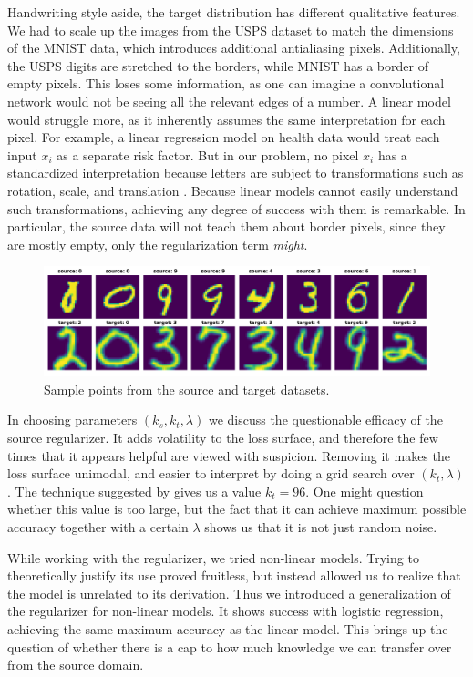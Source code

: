 \documentclass[twoside,11pt]{article}
\begin{document}
Handwriting style aside, the target distribution has different qualitative features. We had to scale up the images from the USPS dataset to match the dimensions of the MNIST data, which introduces additional antialiasing pixels. Additionally, the USPS digits are stretched to the borders, while MNIST has a border of empty pixels. This loses some information, as one can imagine a convolutional network would not be seeing all the relevant edges of a number. A linear model would struggle more, as it inherently assumes the same interpretation for each pixel. For example, a linear regression model on health data would treat each input $x_i$ as a separate risk factor. But in our problem, no pixel $x_i$ has a standardized interpretation because letters are subject to transformations such as rotation, scale, and translation \cite{brunton_kutz_2019}. Because linear models cannot easily understand such transformations, achieving any degree of success with them is remarkable. In particular, the source data will not teach them about border pixels, since they are mostly empty, only the regularization term \emph{might}.

\begin{figure}[htbp]
  \centering
  \includegraphics[width=1.0\textwidth]{img/data_sample.png}
  \caption{Sample points from the source and target datasets.}
  \label{fig:data_sample}
\end{figure}

In choosing parameters $(k_s, k_t, \lambda)$ we discuss the questionable efficacy of the source regularizer. It adds volatility to the loss surface, and therefore the few times that it appears helpful are viewed with suspicion. Removing it makes the loss surface unimodal, and easier to interpret by doing a grid search over $(k_t, \lambda)$. The technique suggested by \cite{gavish2014optimal} gives us a value $k_t = 96$. One might question whether this value is too large, but the fact that it can achieve maximum possible accuracy together with a certain $\lambda$ shows us that it is not just random noise. 

While working with the regularizer, we tried non-linear models. Trying to theoretically justify its use proved fruitless, but instead allowed us to realize that the model is unrelated to its derivation. Thus we introduced a generalization of the regularizer for non-linear models. It shows success with logistic regression, achieving the same maximum accuracy as the linear model. This brings up the question of whether there is a cap to how much knowledge we can transfer over from the source domain. 
\end{document}
